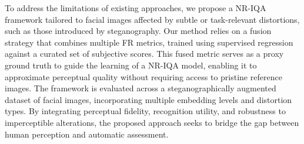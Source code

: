 To address the limitations of existing approaches, we propose a NR-IQA framework tailored to facial images affected by subtle or task-relevant distortions, such as those introduced by steganography. Our method relies on a fusion strategy that combines multiple FR metrics, trained using supervised regression against a curated set of subjective scores. This fused metric serves as a proxy ground truth to guide the learning of a NR-IQA model, enabling it to approximate perceptual quality without requiring access to pristine reference images. The framework is evaluated across a steganographically augmented dataset of facial images, incorporating multiple embedding levels and distortion types. By integrating perceptual fidelity, recognition utility, and robustness to imperceptible alterations, the proposed approach seeks to bridge the gap between human perception and automatic assessment.
